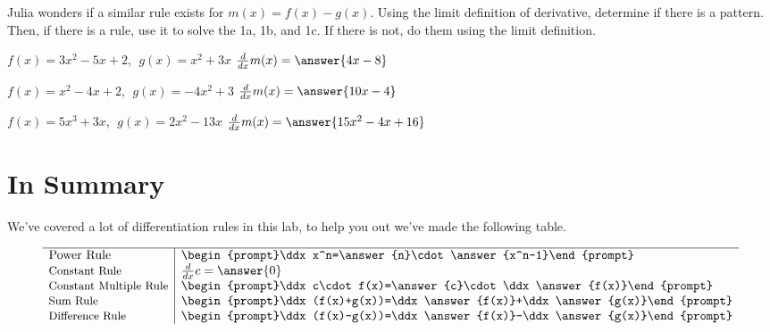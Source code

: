 \documentclass{ximera}
\begin{document}
\begin{question}
Julia wonders if a similar rule exists for $m(x) = f(x)-g(x)$. Using the limit definition of derivative, determine if there is a pattern. Then, if there is a rule, use it to solve the 1a, 1b, and 1c. If there is not, do them using the limit definition.

$f(x) = 3x^2 - 5x + 2$, $\;g(x) = x^2 + 3x$ \hspace{11mm} $\frac{d}{dx}m(x) =  \answer{4x-8}$

$f(x) = x^2 - 4x + 2$, $\;g(x) = -4x^2 + 3$ \hspace{10mm} $\frac{d}{dx}m(x) =  \answer{10x-4}$

$f(x) = 5x^3 + 3x$, $\;g(x) = 2x^2 - 13x$ \hspace{13mm} $\frac{d}{dx}m(x) =  \answer{15x^2-4x+16}$
\end{question}
\section{In Summary}
We've covered a lot of differentiation rules in this lab, to help you out we've made the following table.
\begin{question}
\[
\begin{array}{l|l}
\hline
  \text{Power Rule}&\begin{prompt}\ddx x^n=\answer{n}\cdot\answer{x^n-1}\end{prompt}\\
  \small\text{Constant Rule} & \ddx c=\answer{0}\\
  \small\text{Constant Multiple Rule} & \begin{prompt}\ddx c\cdot f(x)=\answer{c}\cdot\ddx \answer{f(x)}\end{prompt}\\
  \small\text{Sum Rule} & \begin{prompt}\ddx (f(x)+g(x))=\ddx \answer{f(x)}+\ddx \answer{g(x)}\end{prompt}\\
  \small\text{Difference Rule} & \begin{prompt}\ddx (f(x)-g(x))=\ddx \answer{f(x)}-\ddx \answer{g(x)}\end{prompt}
\end{array}
\]
\end{question}

\pagebreak
\end{document}
